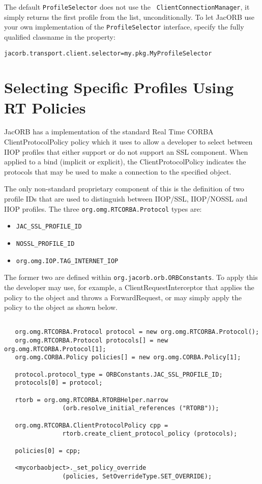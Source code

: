 The default {\tt ProfileSelector} does not use the {\tt
 ClientConnectionManager}, it simply returns the first profile from
 the list, unconditionally.  To let JacORB use your own implementation
 of the {\tt ProfileSelector} interface, specify the fully qualified
 classname in the property:

\begin{verbatim}
jacorb.transport.client.selector=my.pkg.MyProfileSelector
\end{verbatim}

\section{Selecting Specific Profiles Using RT Policies}
JacORB has a implementation of the standard Real Time CORBA ClientProtocolPolicy
policy which it uses to allow a developer to select between IIOP profiles that
either support or do not support an SSL component. When applied to a bind
(implicit or explicit), the ClientProtocolPolicy indicates the protocols that
 may be used to make a connection to the specified object.

The only non-standard proprietary component of this is the definition of two profile
IDs that are used to distinguish between IIOP/SSL, IIOP/NOSSL and IIOP profiles. The
three {\tt org.omg.RTCORBA.Protocol} types are:

\begin{itemize}
\item {\tt JAC\_SSL\_PROFILE\_ID}
\item {\tt NOSSL\_PROFILE\_ID}
\item {\tt org.omg.IOP.TAG\_INTERNET\_IOP}
\end {itemize}

The former two are defined within {\tt org.jacorb.orb.ORBConstants}. To apply
this the developer may use, for example, a ClientRequestInterceptor that applies
the policy to the object and throws a ForwardRequest, or may simply apply the
policy to the object as shown below.

\begin{samepage}
\begin{small}
\begin{verbatim}

   org.omg.RTCORBA.Protocol protocol = new org.omg.RTCORBA.Protocol();
   org.omg.RTCORBA.Protocol protocols[] = new org.omg.RTCORBA.Protocol[1];
   org.omg.CORBA.Policy policies[] = new org.omg.CORBA.Policy[1];

   protocol.protocol_type = ORBConstants.JAC_SSL_PROFILE_ID;
   protocols[0] = protocol;

   rtorb = org.omg.RTCORBA.RTORBHelper.narrow
                (orb.resolve_initial_references ("RTORB"));

   org.omg.RTCORBA.ClientProtocolPolicy cpp =
                rtorb.create_client_protocol_policy (protocols);

   policies[0] = cpp;

   <mycorbaobject>._set_policy_override
                (policies, SetOverrideType.SET_OVERRIDE);
\end{verbatim}
\end{small}
\end{samepage}


